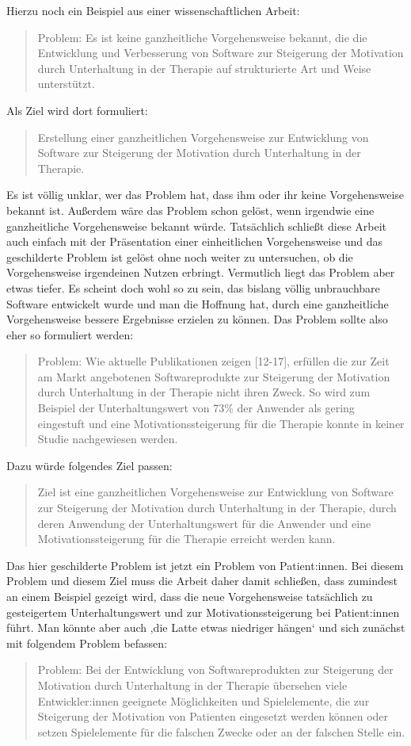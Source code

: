 \begin{temp}
Hierzu noch ein Beispiel aus einer wissenschaftlichen Arbeit:
\blockquote{Problem: Es ist keine ganzheitliche Vorgehensweise bekannt, die die Entwicklung und Verbesserung von Software zur Steigerung der Motivation durch Unterhaltung in der Therapie auf strukturierte Art und Weise unterstützt.}
Als Ziel wird dort formuliert:
\blockquote{Erstellung einer ganzheitlichen Vorgehensweise zur Entwicklung von Software zur Steigerung der Motivation durch Unterhaltung in der Therapie.}
Es ist völlig unklar, wer das Problem hat, dass ihm oder ihr keine Vorgehensweise bekannt ist.
Außerdem wäre das Problem schon gelöst, wenn irgendwie eine ganzheitliche Vorgehensweise bekannt würde.
Tatsächlich schließt diese Arbeit auch einfach mit der Präsentation einer einheitlichen Vorgehensweise und das geschilderte Problem ist gelöst ohne noch weiter zu untersuchen, ob die Vorgehensweise irgendeinen Nutzen erbringt.
Vermutlich liegt das Problem aber etwas tiefer.
Es scheint doch wohl so zu sein, das bislang völlig unbrauchbare Software entwickelt wurde und man die Hoffnung hat, durch eine ganzheitliche Vorgehensweise bessere Ergebnisse erzielen zu können.
Das Problem sollte also eher so formuliert werden:
\blockquote{Problem: Wie aktuelle Publikationen zeigen [12-17], erfüllen die zur Zeit am Markt angebotenen  Softwareprodukte zur Steigerung der Motivation durch Unterhaltung in der Therapie nicht ihren Zweck.
So wird zum Beispiel der Unterhaltungswert von 73\% der Anwender als gering eingestuft und eine Motivationssteigerung für die Therapie konnte in keiner Studie nachgewiesen werden.}
Dazu würde folgendes Ziel passen:
\blockquote{Ziel ist eine ganzheitlichen Vorgehensweise zur Entwicklung von Software zur Steigerung der Motivation durch Unterhaltung in der Therapie, durch deren Anwendung der Unterhaltungswert für die Anwender und eine Motivationssteigerung für die Therapie erreicht werden kann.}
Das hier geschilderte Problem ist jetzt ein Problem von Patient:innen.
Bei diesem Problem und diesem Ziel muss die Arbeit daher damit schließen, dass zumindest an einem Beispiel gezeigt wird, dass die neue Vorgehensweise tatsächlich zu gesteigertem Unterhaltungswert und zur Motivationssteigerung bei Patient:innen führt.
Man könnte aber auch ‚die Latte etwas niedriger hängen‘ und sich zunächst mit folgendem Problem befassen:
\blockquote{Problem: Bei der Entwicklung von Softwareprodukten zur Steigerung der Motivation durch Unterhaltung in der Therapie übersehen viele Entwickler:innen geeignete Möglichkeiten und Spielelemente, die zur Steigerung der Motivation von Patienten eingesetzt werden können oder setzen Spielelemente für die falschen Zwecke oder an der falschen Stelle ein.}

\end{temp}
